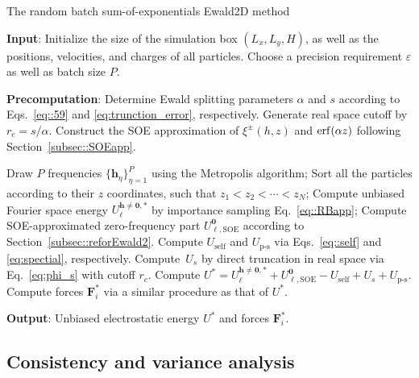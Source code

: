 \begin{algorithm}[ht] 
	\caption{The random batch sum-of-exponentials Ewald2D method}
	\begin{algorithmic}[1]
		
		\State \textbf{Input}: Initialize the size of the simulation box $(L_x,L_y, H)$, as well as the positions, velocities, and charges of all particles. Choose a precision requirement $\varepsilon$ as well as batch size $P$.
		
		\State \textbf{Precomputation}: Determine Ewald splitting parameters $\alpha$ and $s$ according to Eqs.~\eqref{eq::59} and \eqref{eq:trunction_error}, respectively. Generate real space cutoff by $r_c=s/\alpha$. Construct the SOE approximation of $\xi^{\pm}(h,z)$ and $\operatorname{erf}(\alpha z)$ following Section~\ref{subsec::SOEapp}.
		
		\Procedure{}       
		\State Draw $P$ frequencies $\{\bm{h}_{\eta}\}_{\eta=1}^{P}$ using the Metropolis algorithm;
		\State Sort all the particles according to their $z$ coordinates, such that $z_1 < z_2 < \cdots < z_N$;
		\State Compute unbiased Fourier space energy $U_{\ell}^{\bm{h}\neq\bm{0},*}$ by importance sampling Eq.~\eqref{eq::RBapp};
		\State Compute SOE-approximated zero-frequency part $U_{\ell,\text{SOE}}^{\bm{0}}$ according to Section~\ref{subsec::reforEwald2}.
		\State Compute $U_{\text{self}}$ and $U_{\text{p-s}}$ via Eqs.~\eqref{eq::self} and \eqref{eq:spectial}, respectively.
		\State Compute~$U_{s}$ by direct truncation in real space via Eq.~\eqref{eq:phi_s} with cutoff $r_c$. %
		\State Compute $U^{*}=U_{\ell}^{\bm{h}\neq\bm{0},*}+U_{\ell,\text{SOE}}^{\bm{0}}-U_{\text{self}}+U_{s}+U_{\text{p-s}}$.
		\State Compute forces $\bm{F}_{i}^{*}$ via a similar procedure as that of $U^{*}$.
		\EndProcedure
		
		\State \textbf{Output}: Unbiased electrostatic energy $U^{*}$ and forces $\bm{F}_{i}^{*}$.
		
	\end{algorithmic}\label{alg:RBSE2D}
\end{algorithm}



\subsection{Consistency and variance analysis}
\label{subsec::consis}

